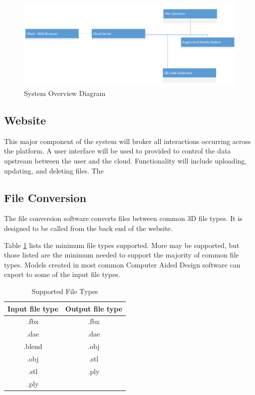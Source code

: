 \begin{figure}
	\centering
	\includegraphics[width=\textwidth]{UMLSystemOverview.png}
	\caption{System Overview Diagram} 
	\label{UMLSystemOverview}	
\end{figure}

\subsection{Website}

This major component of the system will broker all interactions occurring across the platform. A user interface will be used to provided to control the data upstream between the user and the cloud. Functionality will include uploading, updating, and deleting files. The  

\subsection{File Conversion}
The file conversion software converts files between common 3D file types.  It is designed to 
be called from the back end of the website.

Table \ref{table:suportedfiletypes} lists the minimum file types supported.  More may be supported, but those listed are the minimum needed to support the majority of common file types.  
Models created in most common Computer Aided Design software can export to some of the input file types.

\begin{table}[!h]
    \centering
    \begin{tabular}{| c | c |}
        \hline
        Input file type & Output file type \\
        \hline
        .fbx & .fbx \\
        .dae & .dae \\
        .blend & .obj \\ 
        .obj & .stl \\
        .stl & .ply \\
        .ply & \\
        \hline
    \end{tabular}
    \caption{Supported File Types}
    \label{table:suportedfiletypes}
\end{table}

